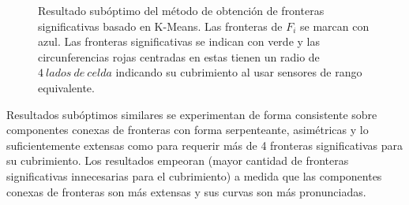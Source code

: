 \begin{figure}[H]
  \centering
  \qquad

  \caption[Resultado subóptimo del método de obtención de fronteras significativas basado en K-Means.]{Resultado subóptimo del método de obtención de fronteras significativas basado en K-Means. Las fronteras de $F_i$ se marcan con azul. Las fronteras significativas se indican con verde y las
    circunferencias rojas centradas en estas tienen un radio de $4\ lados\ de\ celda$ indicando su cubrimiento
    al usar sensores de rango equivalente.}\label{fig:ejemploFSKMMal}
\end{figure}
Resultados subóptimos similares se experimentan de forma consistente sobre
componentes conexas de fronteras con forma serpenteante, asimétricas y lo suficientemente
extensas como para requerir más de 4 fronteras significativas para su
cubrimiento. 
Los resultados empeoran (mayor cantidad de fronteras significativas
innecesarias para el cubrimiento) a medida que las componentes conexas de
fronteras son más extensas y sus curvas son más pronunciadas.


